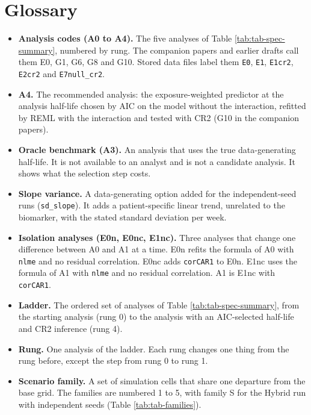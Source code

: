 \documentclass[
  11pt,
]{article}
\providecommand{\tightlist}{%
  \setlength{\itemsep}{0pt}\setlength{\parskip}{0pt}}
\begin{document}
\section*{Glossary}\label{glossary}

\begin{itemize}
\tightlist
\item
  \textbf{Analysis codes (A0 to A4).} The five analyses of Table
  \ref{tab:tab-spec-summary}, numbered by rung. The companion papers
  and earlier drafts call them E0, G1, G6, G8 and G10. Stored data
  files label them \texttt{E0}, \texttt{E1}, \texttt{E1cr2}, \texttt{E2cr2} and \texttt{E7null\_cr2}.
\item
  \textbf{A4.} The recommended analysis: the exposure-weighted predictor at
  the analysis half-life chosen by AIC on the model without the
  interaction, refitted by REML with the interaction and tested with
  CR2 (G10 in the companion papers).
\item
  \textbf{Oracle benchmark (A3).} An analysis that uses the true
  data-generating half-life. It is not available to an analyst and is
  not a candidate analysis. It shows what the selection step costs.
\item
  \textbf{Slope variance.} A data-generating option added for the
  independent-seed runs (\texttt{sd\_slope}). It adds a patient-specific linear
  trend, unrelated to the biomarker, with the stated standard
  deviation per week.
\item
  \textbf{Isolation analyses (E0n, E0nc, E1nc).} Three analyses that change
  one difference between A0 and A1 at a time. E0n refits the formula of
  A0 with \texttt{nlme} and no residual correlation. E0nc adds \texttt{corCAR1} to
  E0n. E1nc uses the formula of A1 with \texttt{nlme} and no residual
  correlation. A1 is E1nc with \texttt{corCAR1}.
\item
  \textbf{Ladder.} The ordered set of analyses of Table
  \ref{tab:tab-spec-summary}, from the starting analysis (rung 0) to the
  analysis with an AIC-selected half-life and CR2 inference (rung 4).
\item
  \textbf{Rung.} One analysis of the ladder. Each rung changes one thing
  from the rung before, except the step from rung 0 to rung 1.
\item
  \textbf{Scenario family.} A set of simulation cells that share one
  departure from the base grid. The families are numbered 1 to 5,
  with family S for the Hybrid run with independent seeds (Table
  \ref{tab:tab-families}).

\end{itemize}
\end{document}
